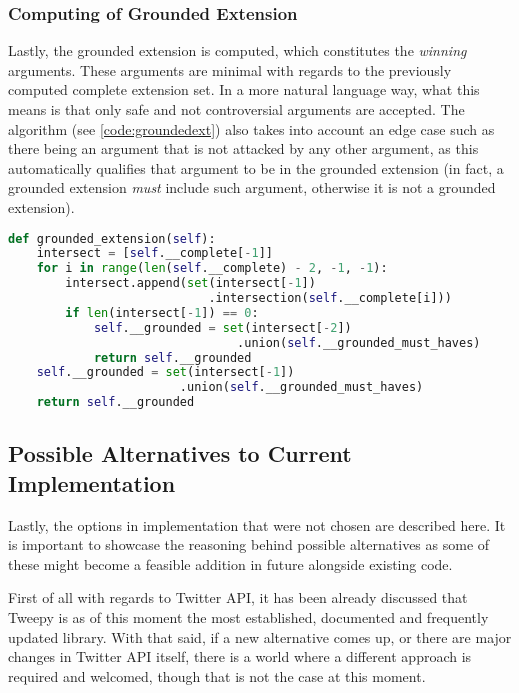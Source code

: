         \subsubsection{Computing of Grounded Extension}
            Lastly, the grounded extension is computed, which constitutes the \textit{winning} arguments. These arguments are minimal with regards to the previously computed complete extension set. In a more natural language way, what this means is that only safe and not controversial arguments are accepted. The algorithm (see \cref{code:groundedext}) also takes into account an edge case such as there being an argument that is not attacked by any other argument, as this automatically qualifies that argument to be in the grounded extension (in fact, a grounded extension \textit{must} include such argument, otherwise it is not a grounded extension).
        
            \begin{lstlisting}[language=Python, caption=Grounded Extension, label=code:groundedext]
def grounded_extension(self):
    intersect = [self.__complete[-1]]
    for i in range(len(self.__complete) - 2, -1, -1):
        intersect.append(set(intersect[-1])
                            .intersection(self.__complete[i]))
        if len(intersect[-1]) == 0:
            self.__grounded = set(intersect[-2])
                                .union(self.__grounded_must_haves)
            return self.__grounded
    self.__grounded = set(intersect[-1])
                        .union(self.__grounded_must_haves)
    return self.__grounded
            \end{lstlisting}
            
    \subsection{Possible Alternatives to Current Implementation}
        Lastly, the options in implementation that were not chosen are described here. It is important to showcase the reasoning behind possible alternatives as some of these might become a feasible addition in future alongside existing code.
        
        First of all with regards to Twitter API, it has been already discussed that Tweepy is as of this moment the most established, documented and frequently updated library. With that said, if a new alternative comes up, or there are major changes in Twitter API itself, there is a world where a different approach is required and welcomed, though that is not the case at this moment.
        
